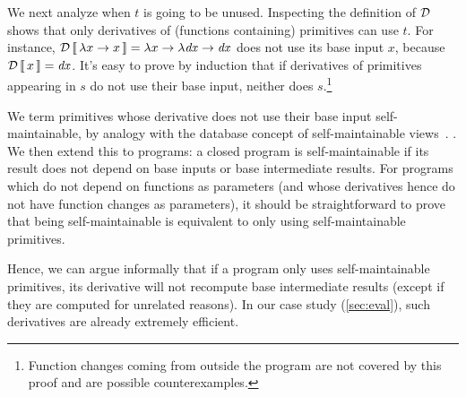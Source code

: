 \begin{oldSec} %
We next analyze when $t$ is going to be unused.
Inspecting the definition of $\mathcal{D}$ shows that only derivatives of (functions
containing) primitives can use $t$. For instance,
$\Derive{\Lam{x}{x}} = \Lam{x}{\Lam{\D x}{\D x}}$ does not use its
base input $x$, because $\Derive{x} = \D x$.
It's easy to prove
by induction that if derivatives of primitives appearing in $s$
do not use their base input, neither does $s$.\footnote{Function
  changes coming from outside the program are not covered by this
  proof and are possible counterexamples.}

We term primitives whose derivative does not use their base input
self-maintainable, by analogy with the database concept of
self-maintainable views~\citep{Gupta99MMV}. .
We then extend this to programs: a
closed program is self-maintainable if its result does not depend
on base inputs or base intermediate results.
%
For programs which do not depend on functions as parameters (and
whose derivatives hence do not have function changes as
parameters), it should be straightforward to prove that being
self-maintainable is equivalent to only using self-maintainable
primitives.

Hence, we can argue informally that if a program only uses
self-maintainable primitives, its derivative will not recompute
base intermediate results (except if they are computed for
unrelated reasons). In our case study (\cref{sec:eval}),
such derivatives are already
extremely efficient.

\end{oldSec}
